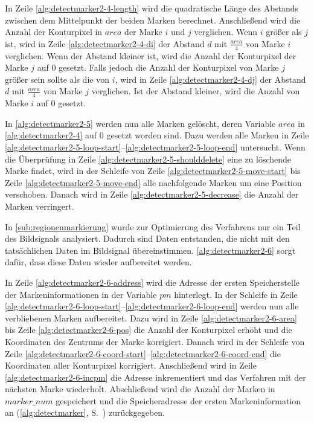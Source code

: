 

In Zeile \ref{alg:detectmarker2-4-length} wird die quadratische Länge des Abstands zwischen dem Mittelpunkt der beiden
 Marken berechnet. Anschließend wird die Anzahl der Konturpixel in $\mathit{area}$ der Marke $i$ und $j$ verglichen.
 Wenn $i$ größer als $j$ ist, wird in Zeile \ref{alg:detectmarker2-4-di} der Abstand $d$ mit $\frac{\mathit{area}}{4}$
 von Marke $i$ verglichen. Wenn der Abstand kleiner ist, wird die Anzahl der Konturpixel der Marke $j$ auf $0$ gesetzt.
 Falls jedoch die Anzahl der Konturpixel von Marke $j$ größer sein sollte als die von $i$, wird in Zeile
 \ref{alg:detectmarker2-4-dj} der Abstand $d$ mit $\frac{\mathit{area}}{4}$ von Marke $j$ verglichen. Ist der Abstand
 kleiner, wird die Anzahl von Marke $i$ auf $0$ gesetzt.

In \autoref{alg:detectmarker2-5} werden nun alle Marken gelöscht, deren Variable $\mathit{area}$ in
 \autoref{alg:detectmarker2-4} auf $0$ gesetzt worden sind. Dazu werden alle Marken in Zeile
 \ref{alg:detectmarker2-5-loop-start}--\ref{alg:detectmarker2-5-loop-end} untersucht. Wenn die Überprüfung in Zeile
 \ref{alg:detectmarker2-5-shoulddelete} eine zu löschende Marke findet, wird in der Schleife von Zeile
 \ref{alg:detectmarker2-5-move-start} bis Zeile \ref{alg:detectmarker2-5-move-end} alle nachfolgende Marken um eine
 Position verschoben. Danach wird in Zeile \ref{alg:detectmarker2-5-decrease} die Anzahl der Marken verringert.



In \autoref{sub:regionenmarkierung} wurde zur Optimierung des Verfahrens nur ein Teil des Bildsignals analysiert.
 Dadurch sind Daten entstanden, die nicht mit den tatsächlichen Daten im Bildsignal übereinstimmen.
 \autoref{alg:detectmarker2-6} sorgt dafür, dass diese Daten wieder aufbereitet werden.



In Zeile \ref{alg:detectmarker2-6-address} wird die Adresse der ersten Speicherstelle der Markeninformationen in der
 Variable $\mathit{pm}$ hinterlegt. In der Schleife in Zeile
 \ref{alg:detectmarker2-6-loop-start}--\ref{alg:detectmarker2-6-loop-end} werden nun alle verbliebenen Marken
 aufbereitet. Dazu wird in Zeile \ref{alg:detectmarker2-6-area} bis Zeile \ref{alg:detectmarker2-6-pos} die Anzahl der
 Konturpixel erhöht und die Koordinaten des Zentrums der Marke korrigiert. Danach wird in der Schleife von Zeile
 \ref{alg:detectmarker2-6-coord-start}--\ref{alg:detectmarker2-6-coord-end} die Koordinaten aller Konturpixel
 korrigiert. Anschließend wird in Zeile \ref{alg:detectmarker2-6-incpm} die Adresse inkrementiert und das Verfahren mit
 der nächsten Marke wiederholt. Abschließend wird die Anzahl der Marken in $\mathit{marker\_num}$ gespeichert und die
 Speicheradresse der ersten Markeninformation an  (\autoref{alg:detectmarker},
 S.~\pageref{alg:detectmarker}) zurückgegeben.


